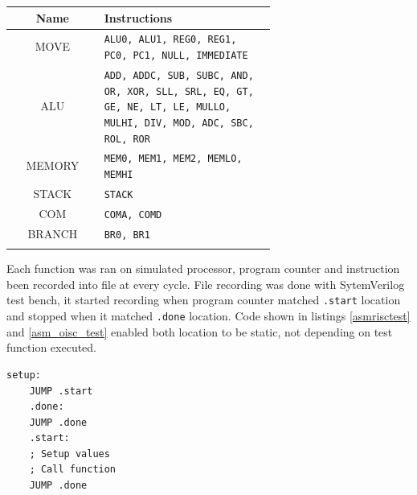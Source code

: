 \begin{blockpage}
	\begin{tabular}{| c | p{0.65\linewidth} |} \hline 
		\rowcolor[rgb]{0.82,0.82,0.82}
		Name & Instructions \\\hline	
		\arrayrulecolor[rgb]{0.82,0.82,0.82}	
		MOVE & \texttt{ALU0, ALU1, REG0, REG1, PC0, PC1, NULL, IMMEDIATE} \\\hline
		ALU & \texttt{ADD, ADDC, SUB, SUBC,
		AND, OR, XOR, SLL,
		SRL, EQ, GT, GE, NE,
		LT, LE, MULLO, MULHI, DIV, MOD,
		ADC, SBC, ROL, ROR} \\\hline
		MEMORY & \texttt{MEM0, MEM1, MEM2, MEMLO, MEMHI} \\\hline
		STACK  & \texttt{STACK} \\\hline
		COM & \texttt{COMA, COMD} \\\hline
		BRANCH & \texttt{BR0, BR1} \\\hline
		\arrayrulecolor[rgb]{0,0,0}\hline
	\end{tabular}
	\label{tab:instr_groups_oisc_src}
\end{blockpage}

Each function was ran on simulated processor, program counter and instruction been recorded into file at every cycle. File recording was done with SytemVerilog test bench, it started recording when program counter matched \texttt{.start} location and stopped when it matched \texttt{.done} location. Code shown in listings \ref{asmrisctest} and \ref{asm_oisc_test} enabled both location to be static, not depending on test function executed.

\begin{blockpage}
	\begin{lstlisting}[frame=single, caption={RISC assembly frame for executring tests}, emph={setup,start,done} label=asmrisctest]
	setup:
	JUMP .start
	.done:
	JUMP .done
	.start:
	; Setup values
	; Call function
	JUMP .done
	\end{lstlisting}
\end{blockpage}

